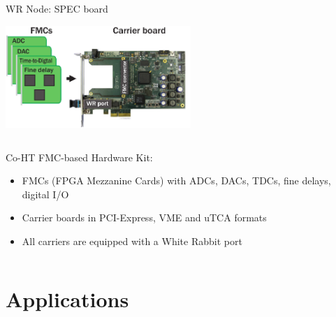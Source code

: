 \documentclass[compress,red]{beamer}
\begin{document}
\begin{frame}{WR Node: SPEC board}

    \begin{center}
    \includegraphics[width=7cm]{node/shw_kit-1}
    \end{center}

  \begin{columns}[c]

	\begin{block}{Co-HT FMC-based Hardware Kit:}
	  \begin{itemize}
	  \item FMCs (FPGA Mezzanine Cards) with ADCs, DACs, TDCs, fine delays, digital I/O
	  \item Carrier boards in PCI-Express, VME and uTCA formats
	  \item All carriers are equipped with a White Rabbit port
	  \end{itemize}
	\end{block}

  \end{columns}


\end{frame}


\section{Applications}
\end{document}
